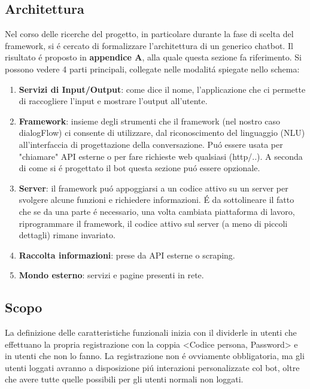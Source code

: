 \documentclass[]{article}
\begin{document}
\subsection{Architettura}
Nel corso delle ricerche del progetto, in particolare durante la fase di scelta del framework, si é cercato di formalizzare l'architettura di un generico chatbot. Il risultato é proposto in \textbf{appendice A}, alla quale questa sezione fa riferimento. Si possono vedere 4 parti principali, collegate nelle modalitá spiegate nello schema: 
\begin{enumerate}
\item \textbf{Servizi di Input/Output}: come dice il nome, l'applicazione che ci permette di raccogliere l'input e mostrare l'output all'utente.
\item \textbf{Framework}: insieme degli strumenti che il framework (nel nostro caso dialogFlow) ci consente di utilizzare, dal riconoscimento del linguaggio (NLU) all'interfaccia di progettazione della conversazione. Puó essere usata per "chiamare" API esterne o per fare richieste web qualsiasi (http/..). A seconda di come si é progettato il bot questa sezione puó essere opzionale.
\item \textbf{Server}: il framework puó appoggiarsi a un codice attivo su un server per svolgere alcune funzioni e richiedere informazioni. É da sottolineare il fatto che se da una parte é necessario, una volta cambiata piattaforma di lavoro, riprogrammare il framework, il codice attivo sul server (a meno di piccoli dettagli) rimane invariato.
\item \textbf{Raccolta informazioni}: prese da API esterne o scraping.
\item \textbf{Mondo esterno}: servizi e pagine presenti in rete.
\end{enumerate}

\subsection{Scopo}
La definizione delle caratteristiche funzionali inizia con il dividerle in utenti che effettuano la propria registrazione con la coppia <Codice persona, Password> e in utenti che non lo fanno. La registrazione non é ovviamente obbligatoria, ma gli utenti loggati avranno a disposizione piú interazioni personalizzate col bot, oltre che avere tutte quelle possibili per gli utenti normali non loggati.
\end{document}
